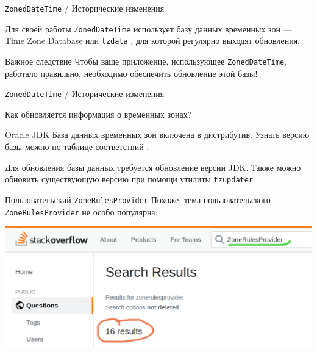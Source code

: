 \documentclass{beamer}
\begin{document}
\begin{frame}[fragile]{{\tt ZonedDateTime} / Исторические изменения}

  Для своей работы {\tt ZonedDateTime} использует базу данных временных зон --- Time Zone Database или {\tt tzdata} \cite{tzdata}, для которой регулярно выходят обновления.

    \begin{alertblock}{Важное следствие}
     	Чтобы ваше приложение, использующее {\tt ZonedDateTime}, работало правильно, необходимо обеспечить обновление этой базы!
    \end{alertblock}

\end{frame}

\begin{frame}[fragile]{{\tt ZonedDateTime} / Исторические изменения}

  Как обновляется информация о временных зонах?

  \begin{block}{Oracle JDK}
  	База данных временных зон включена в дистрибутив. Узнать версию базы можно по таблице соответствий \cite{oracle_tzdata}. 
  	
  	Для обновления базы данных требуется обновление версии JDK. Также можно обновить существующую версию при помощи утилиты {\tt tzupdater} \cite{tzupdater}.
  \end{block}

\end{frame}

\begin{frame}{Пользовательский {\tt ZoneRulesProvider}}
    Похоже, тема пользовательского {\tt ZoneRulesProvider} не особо популярна:
    
    \includegraphics{png/so-results}
\end{frame}
  
\end{document}
